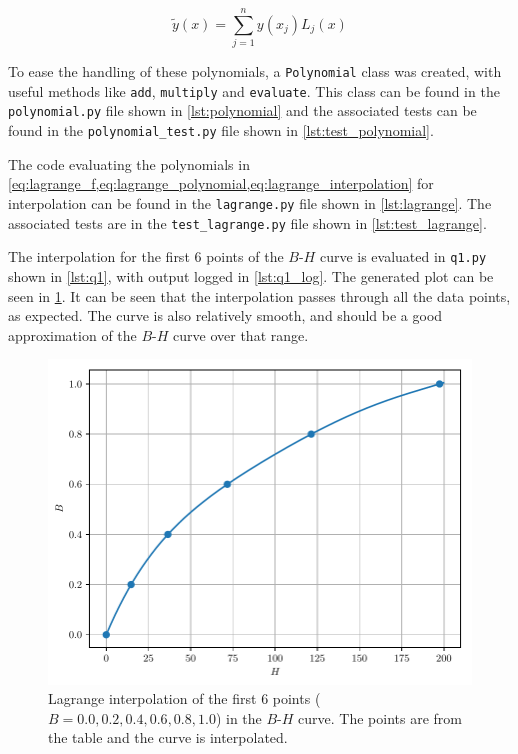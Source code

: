 \documentclass[a4paper,titlepage]{article}
\newcommand{\code}[1]{\texttt{#1}}
\begin{document}
	\begin{equation} \label{eq:lagrange_interpolation}
		\tilde{y}(x) = \sum_{j=1}^{n} y(x_j) L_j(x)
	\end{equation}
	
	To ease the handling of these polynomials, a \code{Polynomial} class was created, with useful methods like \code{add}, \code{multiply} and \code{evaluate}. This class can be found in the \code{polynomial.py} file shown in \cref{lst:polynomial} and the associated tests can be found in the \code{polynomial\_test.py} file shown in \cref{lst:test_polynomial}.
	
	The code evaluating the polynomials in \cref{eq:lagrange_f,eq:lagrange_polynomial,eq:lagrange_interpolation} for interpolation can be found in the \code{lagrange.py} file shown in \cref{lst:lagrange}. The associated tests are in the \code{test\_lagrange.py} file shown in \cref{lst:test_lagrange}.
	
	The interpolation for the first 6 points of the $B$-$H$ curve is evaluated in \code{q1.py} shown in \cref{lst:q1}, with output logged in \cref{lst:q1_log}. The generated plot can be seen in \cref{fig:q1a}. It can be seen that the interpolation passes through all the data points, as expected. The curve is also relatively smooth, and should be a good approximation of the $B$-$H$ curve over that range.
	
	\begin{figure}[!htb]
		\centering
		\includegraphics[width=\columnwidth]{plots/q1a.pdf}
		\caption
		{Lagrange interpolation of the first 6 points ($B = 0.0, 0.2, 0.4, 0.6, 0.8, 1.0$) in the $B$-$H$ curve. The points are from the table and the curve is interpolated.}
		\label{fig:q1a}
	\end{figure}
	
\end{document}
